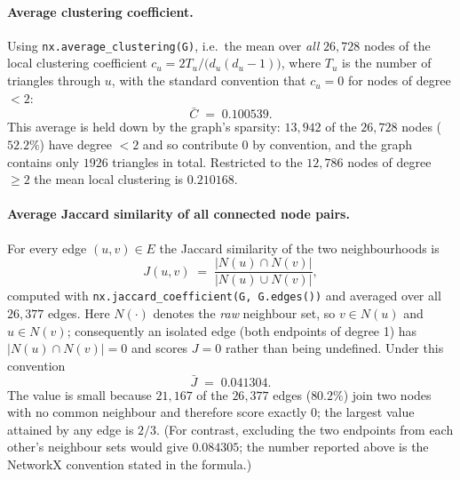 \paragraph{Average clustering coefficient.}
Using \texttt{nx.average\_clustering(G)}, i.e.\ the mean over \emph{all} $26{,}728$
nodes of the local clustering coefficient
$c_u = 2T_u / \bigl(d_u(d_u-1)\bigr)$, where $T_u$ is the number of triangles
through $u$, with the standard convention that $c_u=0$ for nodes of degree $<2$:
\[
  \bar{C} \;=\; 0.100539 .
\]
This average is held down by the graph's sparsity: $13{,}942$ of the $26{,}728$
nodes ($52.2\%$) have degree $<2$ and so contribute $0$ by convention, and the
graph contains only $1926$ triangles in total. Restricted to the $12{,}786$ nodes
of degree $\ge 2$ the mean local clustering is $0.210168$.

\paragraph{Average Jaccard similarity of all connected node pairs.}
For every edge $(u,v)\in E$ the Jaccard similarity of the two neighbourhoods is
\[
  J(u,v) \;=\; \frac{\lvert N(u)\cap N(v)\rvert}{\lvert N(u)\cup N(v)\rvert},
\]
computed with \texttt{nx.jaccard\_coefficient(G, G.edges())} and averaged over all
$26{,}377$ edges. Here $N(\cdot)$ denotes the \emph{raw} neighbour set, so
$v\in N(u)$ and $u\in N(v)$; consequently an isolated edge (both endpoints of
degree 1) has $\lvert N(u)\cap N(v)\rvert=0$ and scores $J=0$ rather than being
undefined. Under this convention
\[
  \bar{J} \;=\; 0.041304 .
\]
The value is small because $21{,}167$ of the $26{,}377$ edges ($80.2\%$) join two
nodes with no common neighbour and therefore score exactly $0$; the largest value
attained by any edge is $2/3$. (For contrast, excluding the two endpoints from each
other's neighbour sets would give $0.084305$; the number reported above is the
NetworkX convention stated in the formula.)
